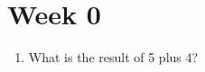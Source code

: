 \documentclass[a4paper,12pt]{CURSUS}
\newcommand{\BN}{\begin{enumerate}}
\newcommand{\EN}{\end{enumerate}}
\begin{document}
\addtocounter{chapter}{-1}
\renewcommand{\chaptername}{Assignment}
\chapter{Week 0}

 \BN

 \item

 \begin{center}

 What is the result of 5 plus 4?

 \end{center}

 \EN
\end{document}
